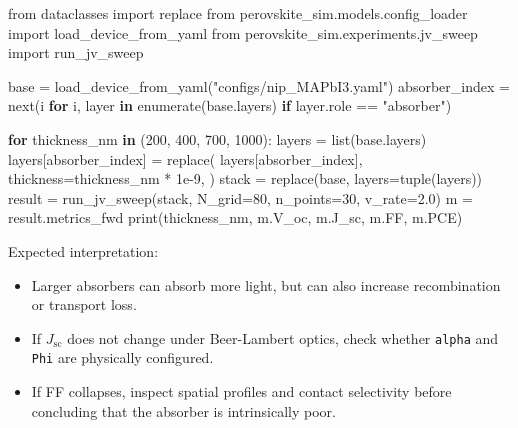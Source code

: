 \documentclass[
  11pt,
  american,
]{report}
\newenvironment{Shaded}{}{}
\newcommand{\BuiltInTok}[1]{#1}
\newcommand{\ControlFlowTok}[1]{\textcolor[rgb]{0.00,0.44,0.13}{\textbf{#1}}}
\newcommand{\DecValTok}[1]{\textcolor[rgb]{0.25,0.63,0.44}{#1}}
\newcommand{\FloatTok}[1]{\textcolor[rgb]{0.25,0.63,0.44}{#1}}
\newcommand{\ImportTok}[1]{#1}
\newcommand{\KeywordTok}[1]{\textcolor[rgb]{0.00,0.44,0.13}{\textbf{#1}}}
\newcommand{\NormalTok}[1]{#1}
\newcommand{\OperatorTok}[1]{\textcolor[rgb]{0.40,0.40,0.40}{#1}}
\newcommand{\StringTok}[1]{\textcolor[rgb]{0.25,0.44,0.63}{#1}}
\providecommand{\tightlist}{%
  \setlength{\itemsep}{0pt}\setlength{\parskip}{0pt}}
\begin{document}
\begin{Shaded}
\begin{Highlighting}[]
\ImportTok{from}\NormalTok{ dataclasses }\ImportTok{import}\NormalTok{ replace}
\ImportTok{from}\NormalTok{ perovskite\_sim.models.config\_loader }\ImportTok{import}\NormalTok{ load\_device\_from\_yaml}
\ImportTok{from}\NormalTok{ perovskite\_sim.experiments.jv\_sweep }\ImportTok{import}\NormalTok{ run\_jv\_sweep}

\NormalTok{base }\OperatorTok{=}\NormalTok{ load\_device\_from\_yaml(}\StringTok{"configs/nip\_MAPbI3.yaml"}\NormalTok{)}
\NormalTok{absorber\_index }\OperatorTok{=} \BuiltInTok{next}\NormalTok{(i }\ControlFlowTok{for}\NormalTok{ i, layer }\KeywordTok{in} \BuiltInTok{enumerate}\NormalTok{(base.layers)}
                      \ControlFlowTok{if}\NormalTok{ layer.role }\OperatorTok{==} \StringTok{"absorber"}\NormalTok{)}

\ControlFlowTok{for}\NormalTok{ thickness\_nm }\KeywordTok{in}\NormalTok{ (}\DecValTok{200}\NormalTok{, }\DecValTok{400}\NormalTok{, }\DecValTok{700}\NormalTok{, }\DecValTok{1000}\NormalTok{):}
\NormalTok{    layers }\OperatorTok{=} \BuiltInTok{list}\NormalTok{(base.layers)}
\NormalTok{    layers[absorber\_index] }\OperatorTok{=}\NormalTok{ replace(}
\NormalTok{        layers[absorber\_index],}
\NormalTok{        thickness}\OperatorTok{=}\NormalTok{thickness\_nm }\OperatorTok{*} \FloatTok{1e{-}9}\NormalTok{,}
\NormalTok{    )}
\NormalTok{    stack }\OperatorTok{=}\NormalTok{ replace(base, layers}\OperatorTok{=}\BuiltInTok{tuple}\NormalTok{(layers))}
\NormalTok{    result }\OperatorTok{=}\NormalTok{ run\_jv\_sweep(stack, N\_grid}\OperatorTok{=}\DecValTok{80}\NormalTok{, n\_points}\OperatorTok{=}\DecValTok{30}\NormalTok{, v\_rate}\OperatorTok{=}\FloatTok{2.0}\NormalTok{)}
\NormalTok{    m }\OperatorTok{=}\NormalTok{ result.metrics\_fwd}
    \BuiltInTok{print}\NormalTok{(thickness\_nm, m.V\_oc, m.J\_sc, m.FF, m.PCE)}
\end{Highlighting}
\end{Shaded}

Expected interpretation:

\begin{itemize}
\tightlist
\item
  Larger absorbers can absorb more light, but can also increase
  recombination or transport loss.
\item
  If \(J_\mathrm{sc}\) does not change under Beer-Lambert optics, check
  whether \texttt{alpha} and \texttt{Phi} are physically configured.
\item
  If FF collapses, inspect spatial profiles and contact selectivity
  before concluding that the absorber is intrinsically poor.
\end{itemize}
\end{document}
